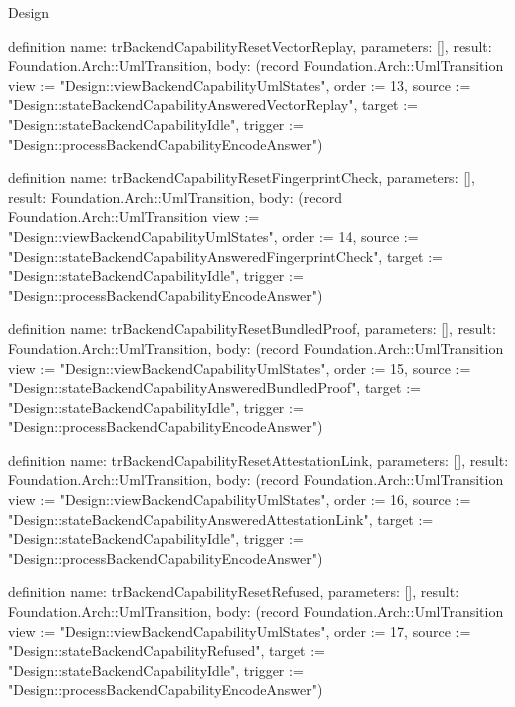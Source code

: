 \begin{lexlean}{Design}
\begin{semanticmodule}
definition{
  name: trBackendCapabilityResetVectorReplay,
  parameters: [],
  result: Foundation.Arch::UmlTransition,
  body: (record Foundation.Arch::UmlTransition {view := "Design::viewBackendCapabilityUmlStates", order := 13, source := "Design::stateBackendCapabilityAnsweredVectorReplay", target := "Design::stateBackendCapabilityIdle", trigger := "Design::processBackendCapabilityEncodeAnswer"})
}

definition{
  name: trBackendCapabilityResetFingerprintCheck,
  parameters: [],
  result: Foundation.Arch::UmlTransition,
  body: (record Foundation.Arch::UmlTransition {view := "Design::viewBackendCapabilityUmlStates", order := 14, source := "Design::stateBackendCapabilityAnsweredFingerprintCheck", target := "Design::stateBackendCapabilityIdle", trigger := "Design::processBackendCapabilityEncodeAnswer"})
}

definition{
  name: trBackendCapabilityResetBundledProof,
  parameters: [],
  result: Foundation.Arch::UmlTransition,
  body: (record Foundation.Arch::UmlTransition {view := "Design::viewBackendCapabilityUmlStates", order := 15, source := "Design::stateBackendCapabilityAnsweredBundledProof", target := "Design::stateBackendCapabilityIdle", trigger := "Design::processBackendCapabilityEncodeAnswer"})
}

definition{
  name: trBackendCapabilityResetAttestationLink,
  parameters: [],
  result: Foundation.Arch::UmlTransition,
  body: (record Foundation.Arch::UmlTransition {view := "Design::viewBackendCapabilityUmlStates", order := 16, source := "Design::stateBackendCapabilityAnsweredAttestationLink", target := "Design::stateBackendCapabilityIdle", trigger := "Design::processBackendCapabilityEncodeAnswer"})
}

definition{
  name: trBackendCapabilityResetRefused,
  parameters: [],
  result: Foundation.Arch::UmlTransition,
  body: (record Foundation.Arch::UmlTransition {view := "Design::viewBackendCapabilityUmlStates", order := 17, source := "Design::stateBackendCapabilityRefused", target := "Design::stateBackendCapabilityIdle", trigger := "Design::processBackendCapabilityEncodeAnswer"})
}
\end{semanticmodule}
\end{lexlean}
